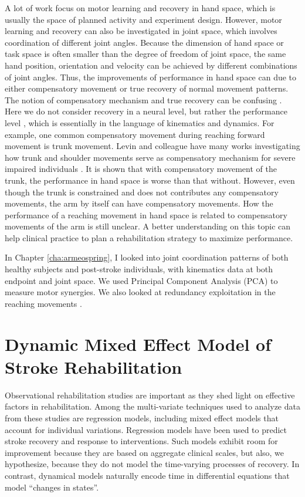 A lot of work \cite{Dipietro2009} focus on motor learning and recovery in hand space, which is usually the space of planned activity and experiment design. 
However, motor learning and recovery can also be investigated in joint space, which involves coordination of different joint angles. 
Because the dimension of hand space or task space is often smaller than the degree of freedom of joint space, the same hand position, orientation and velocity can be achieved by different combinations of joint angles. 
Thus, the improvements of performance in hand space can due to either compensatory movement or true recovery \cite{Cirstea2000, Levin2002, Shaikh2014} of normal movement patterns.
The notion of compensatory mechanism and true recovery can be confusing \cite{Levin2009}. 
Here we do not consider recovery in a neural level, but rather the performance level \cite{Levin2009}, which is essentially in the language of kinematics and dynamics. 
For example, one common compensatory movement during reaching forward movement is trunk movement. 
Levin and colleague have many works investigating how trunk and shoulder movements serve as compensatory mechanism for severe impaired individuals \cite{Cirstea2000}. 
It is shown that with compensatory movement of the trunk, the performance in hand space is worse than that without. 
However, even though the trunk is constrained and does not contributes any compensatory movements, the arm by itself can have compensatory movements. 
How the performance of a reaching movement in hand space is related to compensatory movements of the arm is still unclear. 
A better understanding on this topic can help clinical practice to plan a rehabilitation strategy to maximize performance.

In Chapter \ref{cha:armeospring}, I looked into joint coordination patterns of both healthy subjects and post-stroke individuals, with kinematics data at both endpoint and joint space. 
We used Principal Component Analysis (PCA) to measure motor synergies.
We also looked at redundancy exploitation in the reaching movements \cite{Singh2016}.

\section{Dynamic Mixed Effect Model of Stroke Rehabilitation}
Observational rehabilitation studies are important as they shed light on effective factors in rehabilitation.
Among the multi-variate techniques used to analyze data from these studies are regression models, including mixed effect models that account for individual variations. 
Regression models have been used to predict stroke recovery 
 and response to interventions.
Such models exhibit room for improvement because they are based on aggregate clinical scales, but also, we hypothesize, because they do not model the time-varying processes of recovery. 
In contrast, dynamical models naturally encode time in differential equations that model “changes in states”. 

